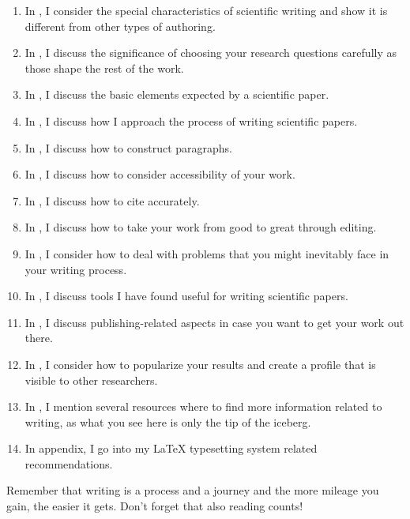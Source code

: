 \begin{enumerate}
    \item In , I consider the special characteristics of scientific writing and show it is different from other types of authoring.
    \item In , I discuss the significance of choosing your research questions carefully as those shape the rest of the work.
    \item In , I discuss the basic elements expected by a scientific paper.
    \item In , I discuss how I approach the process of writing scientific papers.
    \item In , I discuss how to construct paragraphs.
    \item In , I discuss how to consider accessibility of your work.
    \item In , I discuss how to cite accurately.
    \item In , I discuss how to take your work from good to great through editing.
    \item In , I consider how to deal with problems that you might inevitably face in your writing process.
    \item In , I discuss tools I have found useful for writing scientific papers.
    \item In , I discuss publishing-related aspects in case you want to get your work out there.
    \item In , I consider how to popularize your results and create a profile that is visible to other researchers.
    \item In , I mention several resources where to find more information related to writing, as what you see here is only the tip of the iceberg.
    \item In  appendix, I go into my LaTeX typesetting system related recommendations.
\end{enumerate}

Remember that writing is a process and a journey and the more mileage you gain, the easier it gets.
Don't forget that also reading counts!


